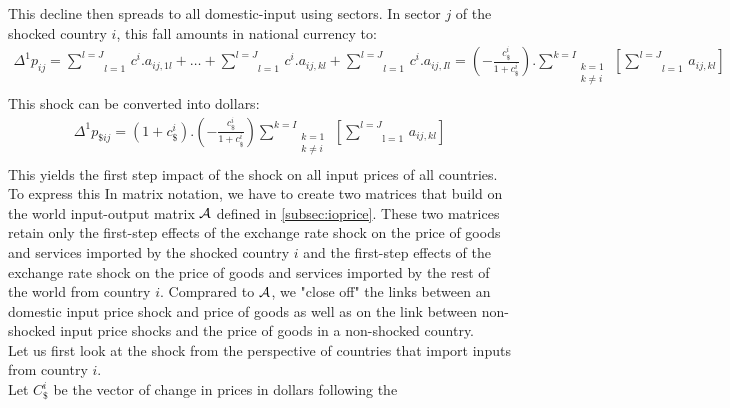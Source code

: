 \documentclass[11pt,a4paper]{article}
\begin{document}
This decline then spreads to all domestic-input using sectors. In sector $j$ of the shocked country $i$, this fall amounts in national currency to: \\
\begin{eqnarray*}
\Delta^1p_{ij}=\underset{l=1}{\overset{l=J}{\mathop \sum}}\,c^i.a_{ij,1l}+\ldots +\underset{l=1}{\overset{{l}=J}{\mathop \sum }}\,c^i.a_{ij,kl}+\underset{l=1}{\overset{l={J}}{\mathop \sum }}\,c^i.{{a}_{ij,Il}}=\left( -\frac{c_\$^i}{1+c_\$^i}\right).\underset{\begin{matrix}k=1\\k\neq i\\\end{matrix}}{\overset{k=I}{\mathop\sum}}\,\left[\underset{l=1}{\overset{l=J}{\mathop\sum}}\,a_{ij,kl}\right] 
\end{eqnarray*}
This shock can be converted into dollars: \\
\begin{eqnarray}
{{\Delta }^{1}}{{{p}}_{\$ij}}=\left(1+c_\$^i\right).\left(-\frac{c_\$^i}{1+c_\$^i}\right)\underset{\begin{matrix}k=1\\k\neq i\\\end{matrix}}{\overset{{k}={I}}{\mathop\sum}}\,\left[\underset{\text{l}=1}{\overset{{l}={J}}{\mathop\sum}}\,{{{a}}_{ij,kl}}\right] 
\label{eq:eq2}
\end{eqnarray}
This yields the first step impact of the shock on all input prices of all countries.\\
To express this In matrix notation, we have to create two matrices that build on the world input-output matrix $\cal A$ defined in \ref{subsec:ioprice}. 
These two matrices retain only the first-step effects of the exchange rate shock on the price of goods and services imported by the shocked country $i$ and the first-step effects of the exchange rate shock on the price of goods and services imported by the rest of the world from country $i$. 
Comprared to $\cal A$, we "close off" the links between an domestic input price shock and price of goods as well as on the link between non-shocked input price shocks and the price of goods in a non-shocked country.\\
Let us first look at the shock from the perspective of countries that import inputs from country $i$.\\
Let $C_\$^i$ be the vector of change in prices in dollars following the 
\end{document}
